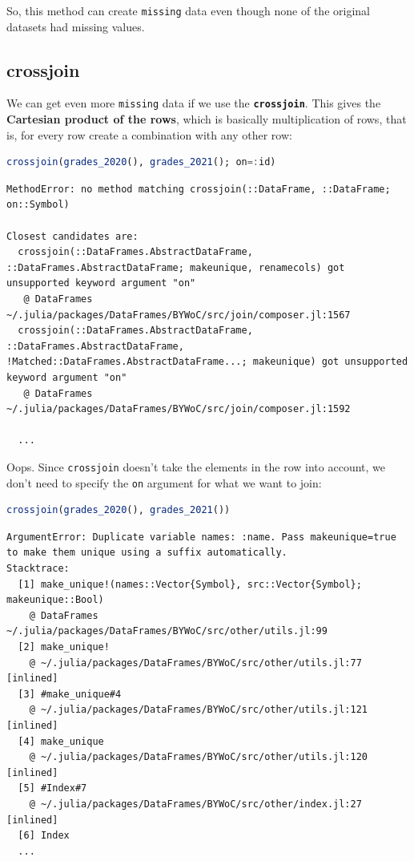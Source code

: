 \documentclass[
  notoc %
]{tufte-book}
\newcommand{\passthrough}[1]{#1}
\begin{document}
So, this method can create \passthrough{\lstinline!missing!} data even
though none of the original datasets had missing values.

\hypertarget{sec:crossjoin}{%
\subsection{crossjoin}\label{sec:crossjoin}}

We can get even more \passthrough{\lstinline!missing!} data if we use
the \textbf{\passthrough{\lstinline!crossjoin!}}. This gives the
\textbf{Cartesian product of the rows}, which is basically
multiplication of rows, that is, for every row create a combination with
any other row:

\begin{lstlisting}[language=Julia]
crossjoin(grades_2020(), grades_2021(); on=:id)
\end{lstlisting}

\begin{lstlisting}[language=Output]
MethodError: no method matching crossjoin(::DataFrame, ::DataFrame; on::Symbol)

Closest candidates are:
  crossjoin(::DataFrames.AbstractDataFrame, ::DataFrames.AbstractDataFrame; makeunique, renamecols) got unsupported keyword argument "on"
   @ DataFrames ~/.julia/packages/DataFrames/BYWoC/src/join/composer.jl:1567
  crossjoin(::DataFrames.AbstractDataFrame, ::DataFrames.AbstractDataFrame, !Matched::DataFrames.AbstractDataFrame...; makeunique) got unsupported keyword argument "on"
   @ DataFrames ~/.julia/packages/DataFrames/BYWoC/src/join/composer.jl:1592

  ...
\end{lstlisting}

Oops. Since \passthrough{\lstinline!crossjoin!} doesn't take the
elements in the row into account, we don't need to specify the
\passthrough{\lstinline!on!} argument for what we want to join:

\begin{lstlisting}[language=Julia]
crossjoin(grades_2020(), grades_2021())
\end{lstlisting}

\begin{lstlisting}[language=Output]
ArgumentError: Duplicate variable names: :name. Pass makeunique=true to make them unique using a suffix automatically.
Stacktrace:
  [1] make_unique!(names::Vector{Symbol}, src::Vector{Symbol}; makeunique::Bool)
    @ DataFrames ~/.julia/packages/DataFrames/BYWoC/src/other/utils.jl:99
  [2] make_unique!
    @ ~/.julia/packages/DataFrames/BYWoC/src/other/utils.jl:77 [inlined]
  [3] #make_unique#4
    @ ~/.julia/packages/DataFrames/BYWoC/src/other/utils.jl:121 [inlined]
  [4] make_unique
    @ ~/.julia/packages/DataFrames/BYWoC/src/other/utils.jl:120 [inlined]
  [5] #Index#7
    @ ~/.julia/packages/DataFrames/BYWoC/src/other/index.jl:27 [inlined]
  [6] Index
  ...
\end{lstlisting}
\end{document}
